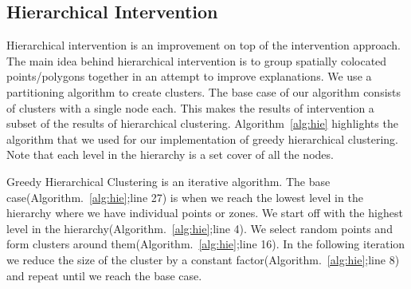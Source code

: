 \subsection{Hierarchical Intervention}
\label{sec:hie_impl}
Hierarchical intervention is an improvement on top of the intervention approach. The main idea behind hierarchical intervention is to group spatially colocated points/polygons together in an attempt to improve explanations. We use a partitioning algorithm to create clusters. The base case of our algorithm consists of clusters with a single node each. This makes the results of intervention a subset of the results of hierarchical clustering. Algorithm~\ref{alg:hie} highlights the algorithm that we used for our implementation of greedy hierarchical clustering. Note that each level in the hierarchy is a set cover of all the nodes.

Greedy Hierarchical Clustering is an iterative algorithm. The base case(Algorithm.~\ref{alg:hie};line 27) is when we reach the lowest level in the hierarchy where we have individual points or zones. We start off with the highest level in the hierarchy(Algorithm.~\ref{alg:hie};line 4). We select random points and form clusters around them(Algorithm.~\ref{alg:hie};line 16). In the following iteration we reduce the size of the cluster by a constant factor(Algorithm.~\ref{alg:hie};line 8) and repeat until we reach the base case.


